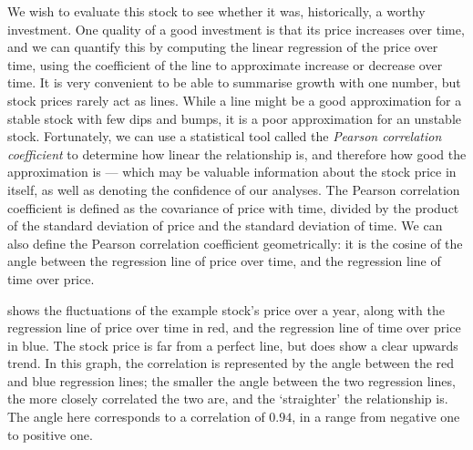 We wish to evaluate this stock to see whether it was, historically, a worthy investment.
One quality of a good investment is that its price increases over time, and we can quantify this by computing the linear regression of the price over time, using the coefficient of the line to approximate increase or decrease over time.
It is very convenient to be able to summarise growth with one number, but stock prices rarely act as lines.
While a line might be a good approximation for a stable stock with few dips and bumps, it is a poor approximation for an unstable stock.
Fortunately, we can use a statistical tool called the \emph{Pearson correlation coefficient} to determine how linear the relationship is, and therefore how good the approximation is --- which may be valuable information about the stock price in itself, as well as denoting the confidence of our analyses.
The Pearson correlation coefficient is defined as the covariance of price with time, divided by the product of the standard deviation of price and the standard deviation of time.
We can also define the Pearson correlation coefficient geometrically: it is the cosine of the angle between the regression line of price over time, and the regression line of time over price.



 shows the fluctuations of the example stock's price over a year, along with the regression line of price over time in red, and the regression line of time over price in blue.
The stock price is far from a perfect line, but does show a clear upwards trend.
In this graph, the correlation is represented by the angle between the red and blue regression lines; the smaller the angle between the two regression lines, the more closely correlated the two are, and the `straighter' the relationship is.
The angle here corresponds to a correlation of $0.94$, in a range from negative one to positive one.


